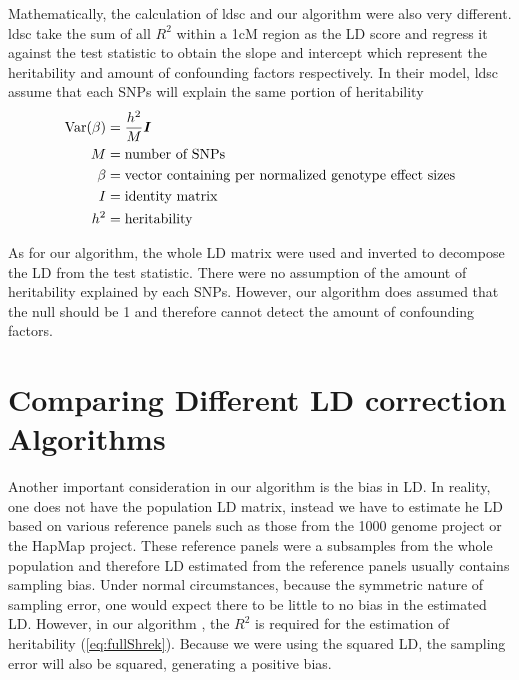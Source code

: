 			Mathematically, the calculation of \gls{ldsc} and our algorithm were also very different. 
			\gls{ldsc} take the sum of all $R^2$ within a 1cM region as the LD score and regress it against the test statistic to obtain the slope and intercept which represent the heritability and amount of confounding factors respectively. 
			In their model, \gls{ldsc} assume that each \glspl{SNP} will explain the same portion of heritability
			\begin{align}
			 \mathrm{Var}(\beta)&=\frac{h^2}{M}\boldsymbol{I}\\
			 M &= \text{number of SNPs}\notag\\
			 \beta &= \text{vector containing per normalized genotype effect sizes}\notag\\
			 I &= \text{identity matrix}\notag\\
			 h^2 &= \text{heritability}\notag
			\end{align}
			
			As for our algorithm, the whole \gls{LD} matrix were used and inverted to decompose the \gls{LD} from the test statistic. 
			There were no assumption of the amount of heritability explained by each \glspl{SNP}. 
			However, our algorithm does assumed that the null should be 1 and therefore cannot detect the amount of confounding factors.  
			
	\section{Comparing Different LD correction Algorithms}
		\label{sec:ldSim}
		Another important consideration in our algorithm is the bias in \gls{LD}.
		In reality, one does not have the population \gls{LD} matrix, instead we have to estimate he \gls{LD} based on various reference panels such as those from the 1000 genome project\citep{Project2012} or the HapMap project\citep{Altshuler2010}.
		These reference panels were a subsamples from the whole population and therefore \gls{LD} estimated from the reference panels usually contains sampling bias.
		Under normal circumstances, because the symmetric nature of sampling error, one would expect there to be little to no bias in the estimated \gls{LD}.
		However, in our algorithm , the $R^2$ is required for the estimation of heritability (\cref{eq:fullShrek}).
		Because we were using the squared \gls{LD}, the sampling error will also be squared, generating a positive bias. 
		
